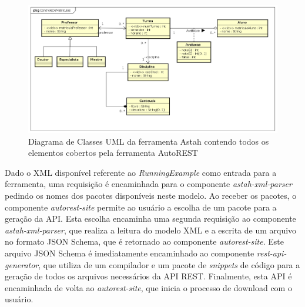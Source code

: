 \begin{figure}
    \begin{center}
        \includegraphics[scale=0.4]{imagens/RunningExample.png}
    \end{center}
	\caption{\label{fig:samplemodel}Diagrama de Classes UML da ferramenta Astah contendo todos os elementos cobertos pela ferramenta AutoREST}
\end{figure}

Dado o XML disponível referente ao \textit{RunningExample} como entrada para a ferramenta, uma requisição é encaminhada para o componente \textit{astah-xml-parser} pedindo os nomes dos pacotes disponíveis neste modelo. Ao receber os pacotes, o componente \textit{autorest-site} permite ao usuário a escolha de um pacote para a geração da API. Esta escolha encaminha uma segunda requisição ao componente \textit{astah-xml-parser}, que realiza a leitura do modelo XML e a escrita de um arquivo no formato JSON Schema, que é retornado ao componente \textit{autorest-site}. Este arquivo JSON Schema é imediatamente encaminhado ao componente \textit{rest-api-generator}, que utiliza de um compilador e um pacote de \textit{snippets} de código para a geração de todos os arquivos necessários da API REST. Finalmente, esta API é encaminhada de volta ao \textit{autorest-site}, que inicia o processo de download com o usuário.

